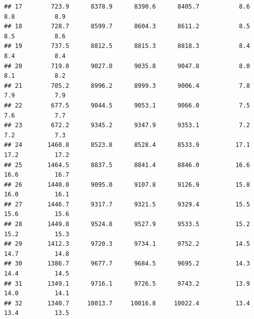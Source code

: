 \documentclass{article}\usepackage[]{graphicx}\usepackage[]{color}
\makeatletter
\newenvironment{kframe}{%
 \def\at@end@of@kframe{}%
 \ifinner\ifhmode%
  \def\at@end@of@kframe{\end{minipage}}%
  \begin{minipage}{\columnwidth}%
 \fi\fi%
 \def\FrameCommand##1{\hskip\@totalleftmargin \hskip-\fboxsep
 \colorbox{shadecolor}{##1}\hskip-\fboxsep
     \hskip-\linewidth \hskip-\@totalleftmargin \hskip\columnwidth}%
 \MakeFramed {\advance\hsize-\width
   \@totalleftmargin\z@ \linewidth\hsize
   \@setminipage}}%
 {\par\unskip\endMakeFramed%
 \at@end@of@kframe}
\newenvironment{knitrout}{}{} %
\makeatother
\begin{document}
\begin{knitrout}
\begin{kframe}
\begin{verbatim}
## 17        723.9      8378.9      8390.6      8405.7           8.6           8.8           8.9
## 18        728.7      8599.7      8604.3      8611.2           8.5           8.5           8.6
## 19        737.5      8812.5      8815.3      8818.3           8.4           8.4           8.4
## 20        719.0      9027.0      9035.8      9047.8           8.0           8.1           8.2
## 21        705.2      8996.2      8999.3      9006.4           7.8           7.9           7.9
## 22        677.5      9044.5      9053.1      9066.0           7.5           7.6           7.7
## 23        672.2      9345.2      9347.9      9353.1           7.2           7.2           7.3
## 24       1460.8      8523.8      8528.4      8533.9          17.1          17.2          17.2
## 25       1464.5      8837.5      8841.4      8846.0          16.6          16.6          16.7
## 26       1440.0      9095.0      9107.8      9126.9          15.8          16.0          16.1
## 27       1446.7      9317.7      9321.5      9329.4          15.5          15.6          15.6
## 28       1449.8      9524.8      9527.9      9533.5          15.2          15.2          15.3
## 29       1412.3      9720.3      9734.1      9752.2          14.5          14.7          14.8
## 30       1386.7      9677.7      9684.5      9695.2          14.3          14.4          14.5
## 31       1349.1      9716.1      9726.5      9743.2          13.9          14.0          14.1
## 32       1340.7     10013.7     10016.8     10022.4          13.4          13.4          13.5
\end{verbatim}
\end{kframe}
\end{knitrout}
\end{document}
